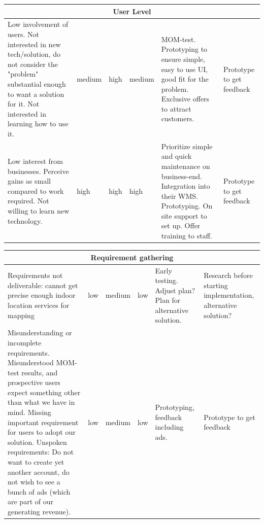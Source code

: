 \documentclass[titlepage]{article}
\begin{document}
\begin{center}
\begin{tabular}{|p{3cm}|p{2cm}|p{2cm}|p{2cm}|p{2cm}|p{2cm}|}
 \hline
 \multicolumn{6}{|c|}{User Level} \\
 \hline
 Low involvement of users. Not interested in new tech/solution, do not consider the "problem" substantial enough to want a solution for it. Not interested in learning how to use it. & medium & high & medium & MOM-test. Prototyping to ensure simple, easy to use UI, good fit for the problem. Exclusive offers to attract customers. & Prototype to get feedback \\  
 \hline
 Low interest from businesses. Perceive gains as small compared to work required. Not willing to learn new technology. & high & high & high & Prioritize simple and quick maintenance on business-end. Integration into their WMS. Prototyping. On site support to set up. Offer training to staff. & Prototype to get feedback \\  
 \hline
 \end{tabular}
\end{center}

 \begin{center}
 \begin{tabular}{|p{3cm}|p{2cm}|p{2cm}|p{2cm}|p{2cm}|p{2cm}|}
 \hline
 \multicolumn{6}{|c|}{Requirement gathering} \\
 \hline
 Requirements not deliverable: cannot get precise enough indoor location services for mapping & low & medium & low & Early testing. Adjust plan? Plan for alternative solution. & Research before starting implementation, alternative solution? \\
 \hline
 Misunderstanding or incomplete requirements. Misunderstood MOM-test results, and prospective users expect something other than what we have in mind. Missing important requirement for users to adopt our solution. Unspoken requirements: Do not want to create yet another account, do not wish to see a bunch of ads (which are part of our generating revenue). & low & medium & low & Prototyping, feedback including ads. & Prototype to get feedback \\
 \hline
 \end{tabular}
 \end{center}
\end{document}
